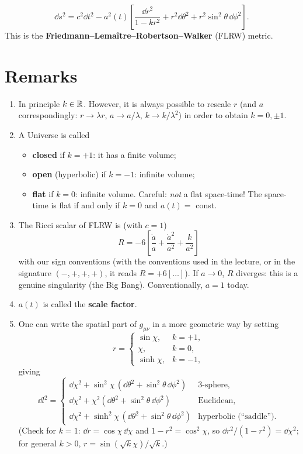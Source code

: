 \begin{keyresult}
\begin{equation}
  \dd s^2=c^2\dd t^2-a^2(t)\left[\frac{\dd r^2}{1-kr^2}+r^2\dd\theta^2+r^2\sin^2\theta\,\dd\phi^2\right].
\end{equation}
This is the \textbf{Friedmann--Lemaître--Robertson--Walker} (FLRW) metric.
\end{keyresult}

\section{Remarks}
\begin{enumerate}[label=(\roman*)]
\item In principle $k\in\mathbb{R}$. However, it is always possible to rescale $r$ (and $a$ correspondingly: $r\to\lambda r$, $a\to a/\lambda$, $k\to k/\lambda^2$) in order to obtain $k=0,\pm1$.
\item A Universe is called
\begin{itemize}[nosep]
\item \textbf{closed} if $k=+1$: it has a finite volume;
\item \textbf{open} (hyperbolic) if $k=-1$: infinite volume;
\item \textbf{flat} if $k=0$: infinite volume. Careful: \emph{not} a flat space-time! The space-time is flat if and only if $k=0$ and $a(t)=$ const.
\end{itemize}
\item The Ricci scalar of FLRW is (with $c=1$)
\begin{equation}
  R=-6\left[\frac{\ddot a}{a}+\frac{\dot a^2}{a^2}+\frac{k}{a^2}\right]
\end{equation}
with our sign conventions (with the conventions used in the lecture, or in the signature $(-,+,+,+)$, it reads $R=+6[\dots]$). If $a\to0$, $R$ diverges: this is a genuine singularity (the Big Bang). Conventionally, $a=1$ today.
\item $a(t)$ is called the \textbf{scale factor}.
\item One can write the spatial part of $g_{\mu\nu}$ in a more geometric way by setting
\[
  r=\begin{cases}\sin\chi,&k=+1,\\ \chi,&k=0,\\ \sinh\chi,&k=-1,\end{cases}
\]
giving
\[
  \dd l^2=\begin{cases}\dd\chi^2+\sin^2\!\chi\,(\dd\theta^2+\sin^2\theta\,\dd\phi^2)&\text{3-sphere},\\
  \dd\chi^2+\chi^2(\dd\theta^2+\sin^2\theta\,\dd\phi^2)&\text{Euclidean},\\
  \dd\chi^2+\sinh^2\chi\,(\dd\theta^2+\sin^2\theta\,\dd\phi^2)&\text{hyperbolic (``saddle'')}.\end{cases}
\]
(Check for $k=1$: $\dd r=\cos\chi\,\dd\chi$ and $1-r^2=\cos^2\chi$, so $\dd r^2/(1-r^2)=\dd\chi^2$; for general $k>0$, $r=\sin(\sqrt k\chi)/\sqrt k$.)
\end{enumerate}

